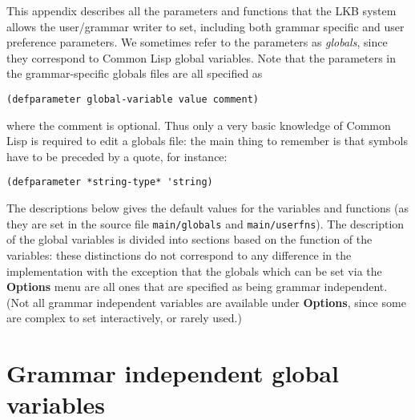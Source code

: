 \documentclass[12pt]{report}
\begin{document}
This appendix describes all the parameters and functions
that the LKB system allows the
user/grammar writer to set, including both grammar specific and
user preference parameters.
We sometimes refer to the parameters as {\it globals}, since they
correspond to Common Lisp global variables. 
Note that the parameters in the grammar-specific globals files are 
all specified as
\begin{verbatim}
(defparameter global-variable value comment)
\end{verbatim}
where the comment is optional.
Thus only a very basic knowledge of Common Lisp is required to
edit a globals file: the main thing to remember is that symbols
have to be preceded by a quote, for instance:
\begin{verbatim}
(defparameter *string-type* 'string)
\end{verbatim}

The descriptions below gives the
default values for the variables and functions
(as they are set in the source file
{\tt main/globals} and {\tt main/userfns}). 
The description of the global variables is divided into sections
based on the function of the variables: these 
distinctions do not correspond to any difference in the implementation
with the exception that the globals which can be set via the
{\bf Options} menu are all ones that are specified as being
grammar independent.  (Not all grammar independent variables
are available under {\bf Options}, since some are complex to set
interactively, or rarely used.)

\section{Grammar independent global variables}
\label{indglob}
\end{document}
